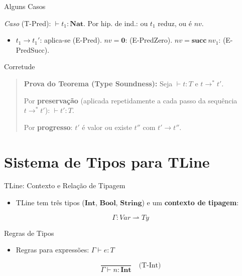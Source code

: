 \begin{frame}{Alguns Casos}

    \emph{Caso} (T-Pred): \(\vdash t_1 : \mathbf{Nat}\). Por hip. de ind.:
    ou \(t_1\) reduz, ou é \(nv\).

    \begin{itemize}

        \item
        \(t_1 \to t_1'\): aplica-se (E-Pred). \checkmark{} \textbar{}
        \(nv = \mathbf{0}\): (E-PredZero). \checkmark{} \textbar{}
        \(nv = \mathbf{succ}\ nv_1\): (E-PredSucc). \checkmark{}
    \end{itemize}
\end{frame}

\begin{frame}{Corretude}

    \begin{quote}
        \textbf{Prova do Teorema (Type Soundness):} Seja \(\vdash t : T\) e
        \(t \to^* t'\).

        Por \textbf{preservação} (aplicada repetidamente a cada passo da
        sequência \(t \to^* t'\)): \(\vdash t' : T\).

        Por \textbf{progresso}: \(t'\) é valor ou existe \(t''\) com
        \(t' \to t''\). \checkmark{}
    \end{quote}
\end{frame}


\section{Sistema de Tipos para
TLine}\label{sistema-de-tipos-para-tline}

\begin{frame}{TLine: Contexto e Relação de Tipagem}

    \begin{itemize}

        \item
        TLine tem três tipos (\(\mathbf{Int}\), \(\mathbf{Bool}\),
        \(\mathbf{String}\)) e um \textbf{contexto de tipagem}:
    \end{itemize}

    \[\Gamma : \mathit{Var} \rightharpoonup \mathit{Ty}\]
\end{frame}

\begin{frame}{Regras de Tipos}

    \begin{itemize}

        \item
        Regras para expressões: \(\Gamma \vdash e : T\)
    \end{itemize}

    \[\frac{}{\Gamma \vdash n : \mathbf{Int}} \quad\text{(T-Int)}\]
\end{frame}

